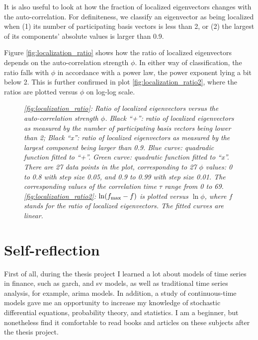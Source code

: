 \documentclass{report}
\begin{document}
It is also useful to look at how the fraction of localized eigenvectors
changes with the auto-correlation. For definiteness, we classify
an eigenvector as being localized when (1) its number of participating
basis vectors is less than 2, or (2) the largest of its components'
absolute values is larger than 0.9.

Figure \ref{fig:localization_ratio} shows how the ratio of localized
eigenvectors depends on the auto-correlation strength $\phi$. In
either way of classification, the ratio falls with $\phi$ in
accordance with a power law, the power exponent lying a bit below 2.
This is further confirmed in plot \ref{fig:localization_ratio2}, where
the ratios are plotted versus $\phi$ on log-log scale.
\begin{figure}[htb!]
  \centering
  \caption{\small \it \ref{fig:localization_ratio}: Ratio of localized
    eigenvectors versus the auto-correlation strength $\phi$. Black
    ``+'': ratio of localized eigenvectors as measured by the number
    of participating basis vectors being lower than 2; Black ``x'':
    ratio of localized eigenvectors as measured by the largest
    component being larger than 0.9. Blue curve: quadradic function
    fitted to ``+''. Green curve: quadratic function fitted to
    ``x''. There are 27 data points in the plot, corresponding to 27
    $\phi$ values: 0 to 0.8 with step size 0.05, and 0.9 to 0.99 with
    step size 0.01. The corresponding values of the correlation time
    $\tau$ range from 0 to 69. \ref{fig:localization_ratio2}: $\ln
    (f_{\text{max}} - f)$ is plotted versus $\ln \phi$, where $f$ stands for the
    ratio of localized eigenvectors. The fitted curves are linear.}
\end{figure}



\chapter{Self-reflection}
First of all, during the thesis project I learned a lot about models
of time series in finance, such as \gls{garch}, and \gls{sv} models,
as well as traditional time series analysis, for example, \gls{arima}
models. In addition, a study of continuous-time models gave me an
opportunity to increase my knowledge of stochastic differential
equations, probability theory, and statistics. I am a beginner, but
nonetheless find it comfortable to read books and articles on these
subjects after the thesis project.
\end{document}

